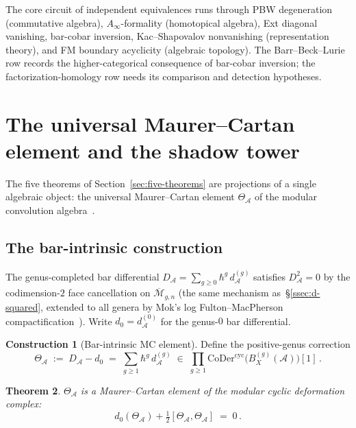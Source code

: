 \documentclass[11pt,reqno]{amsart}
\newtheorem{theorem}{Theorem}[section]
\theoremstyle{definition}
\newtheorem{construction}[theorem]{Construction}
\theoremstyle{remark}
\newcommand{\cA}{\mathcal{A}}
\newcommand{\cM}{\mathcal{M}}
\numberwithin{equation}{section}
\begin{document}
The core circuit of independent equivalences runs through PBW
degeneration (commutative algebra), $A_\infty$-formality
(homotopical algebra), Ext diagonal vanishing, bar-cobar
inversion, Kac--Shapovalov nonvanishing (representation theory),
and FM boundary acyclicity (algebraic topology). The
Barr--Beck--Lurie row records the higher-categorical consequence
of bar-cobar inversion; the factorization-homology row needs its
comparison and detection hypotheses.


\section{The universal Maurer--Cartan element
 and the shadow tower}
\label{sec:mc}

The five theorems of Section~\ref{sec:five-theorems} are
projections of a single algebraic object: the universal
Maurer--Cartan element $\Theta_\cA$ of the modular
convolution algebra~\cite{RNW19,Val16}.

\subsection{The bar-intrinsic construction}
\label{ssec:bar-intrinsic}

The genus-completed bar differential
$D_\cA = \sum_{g \ge 0} \hbar^g\,d^{(g)}_\cA$
satisfies $D_\cA^2 = 0$ by the codimension-$2$ face
cancellation on $\overline{\cM}_{g,n}$ (the same mechanism
as~\S\ref{ssec:d-squared}, extended to all genera by Mok's
log Fulton--MacPherson compactification~\cite{Mok25}). Write
$d_0 = d^{(0)}_\cA$ for the genus-$0$ bar differential.

\begin{construction}[Bar-intrinsic MC element]
\label{constr:bar-intrinsic}
Define the positive-genus correction
\begin{equation}\label{eq:theta-def}
\Theta_\cA
\;:=\;
D_\cA - d_0
\;=\;
\sum_{g \ge 1}
\hbar^g\,d^{(g)}_\cA
\;\in\;
\prod_{g \ge 1}
\mathrm{CoDer}^{\mathrm{cyc}}
\bigl(B^{(g)}_X(\cA)\bigr)[1]\,.
\end{equation}
\end{construction}

\begin{theorem}\label{thm:theta-mc}
$\Theta_\cA$ is a Maurer--Cartan element of the modular
cyclic deformation complex:
\begin{equation}\label{eq:mc-equation}
d_0(\Theta_\cA)
+ \tfrac{1}{2}[\Theta_\cA, \Theta_\cA]
\;=\; 0\,.
\end{equation}
\end{theorem}
\end{document}

